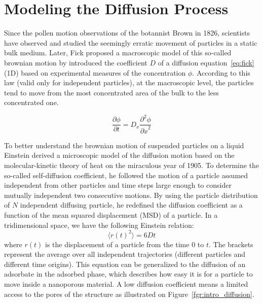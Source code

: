 \documentclass[main]{subfiles}
\begin{document}
\section{Modeling the Diffusion Process}

Since the pollen motion observations of the botannist Brown in 1826, scientists have observed and studied the seemingly erratic movement of particles in a static bulk medium. Later, Fick proposed a macroscopic model of this so-called brownian motion by introduced the coefficient $D$ of a diffusion equation~\ref{eq:fick} (1D) based on experimental measures of the concentration $\phi$.\autocite{Fick_1855} According to this law (valid only for independent particles), at the macroscopic level, the particles tend to move from the most concentrated area of the bulk to the less concentrated one. 

\begin{equation}\label{eq:fick}
  \frac{\partial \phi}{\partial t} = D_x \frac{\partial^2 \phi}{{\partial x}^2}
\end{equation}

To better understand the brownian motion of suspended particles on a liquid Einstein derived a microscopic model of the diffusion motion based on the molecular-kinetic theory of heat on the miraculous year of 1905.\autocite{einstein1905motion} To determine the so-called self-diffusion coefficient, he followed the motion of a particle assumed independent from other particles and time steps large enough to consider mutually independent two consecutive motions.  By using the particle distribution of $N$ independent diffusing particle, he redefined the diffusion coefficient as a function of the mean squared displacement (MSD) of a particle. In a tridimensional space, we have the following Einstein relation:
\begin{equation}\label{eq:einstein}
  \langle {r(t)}^2 \rangle = 6Dt
\end{equation}
where $r(t)$ is the displacement of a particle from the time $0$ to $t$. The brackets represent the average over all independent trajectories (different particles and different time origins). This equation can be generalized to the diffusion of an adsorbate in the adsorbed phase, which describes how easy it is for a particle to move inside a nanoporous material. A low diffusion coefficient means a limited access to the pores of the structure as illustrated on Figure~\ref{fgr:intro_diffusion}.
\end{document}
